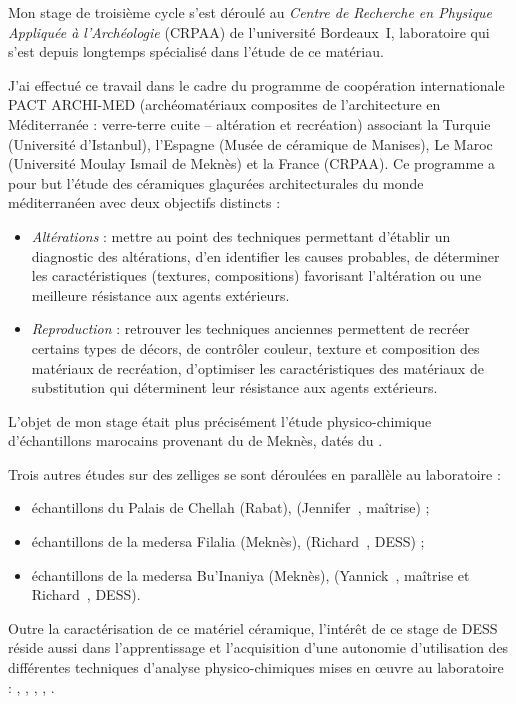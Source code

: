 Mon stage de troisième cycle s'est déroulé au \emph{Centre de 
Recherche en Physique Appliquée à l'Archéologie} (CRPAA) de 
l'université Bordeaux~I, laboratoire qui s'est depuis longtemps 
spécialisé dans l'étude de ce matériau.

J'ai effectué ce travail dans le cadre du programme de coopération 
internationale PACT ARCHI-MED (archéomatériaux composites de 
l'architecture en Méditerranée : verre-terre cuite -- altération et 
recréation) associant la Turquie (Université d'Istanbul), l'Espagne 
(Musée de céramique de Manises), Le Maroc (Université Moulay Ismail 
de Meknès) et la France (CRPAA). Ce programme a pour but l'étude des 
céramiques glaçurées architecturales du monde méditerranéen avec deux 
objectifs distincts :

\begin{itemize}
  \item \emph{Altérations} : mettre au point des techniques 
        permettant d'établir un diagnostic des altérations, 
        d'en identifier les causes probables, de déterminer les 
        caractéristiques (textures, compositions) favorisant 
        l'altération ou une meilleure résistance aux agents extérieurs.
  \item \emph{Reproduction} : retrouver les techniques anciennes 
        permettent de recréer certains types de décors, de contrôler 
        couleur, texture et composition des matériaux de recréation, 
        d'optimiser les caractéristiques des matériaux de substitution 
        qui déterminent leur résistance aux agents extérieurs.
\end{itemize}

L'objet de mon stage était plus précisément l'étude physico-chimique 
d'échantillons marocains  provenant du \PaM de 
Meknès, datés du .

Trois autres études sur des zelliges se sont déroulées en parallèle au 
laboratoire :

\begin{itemize}
  \item échantillons du Palais de Chellah (Rabat), 
         (Jennifer~, maîtrise) ;
  \item échantillons de la medersa Filalia (Meknès), 
         (Richard~, DESS) ;
  \item échantillons de la medersa Bu'Inaniya (Meknès), 
         (Yannick~, maîtrise et 
        Richard~, DESS).
\end{itemize}

Outre la caractérisation de ce matériel céramique, l'intérêt de ce 
stage de DESS réside aussi dans l'apprentissage et l'acquisition 
d'une autonomie d'utilisation des différentes techniques d'analyse 
physico-chimiques mises en {\oe}uvre au laboratoire : \MEB[ie], 
\EDS, \CL, \SAO, \DX.